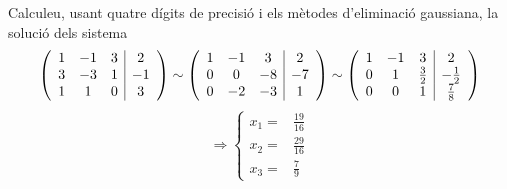 \documentclass[../main.tex]{subfiles}
\begin{document}
    \begin{exercici}
        Calculeu, usant quatre dígits de precisió i els mètodes d'eliminació gaussiana, la solució
        dels sistema
        \begin{displaymath}
            \left(
                \begin{array}{c c c | c}
                    1 & -1 & 3 & 2\\
                    3 & -3 & 1 & -1\\
                    1 & 1  & 0 & 3
                \end{array}
            \right)
            \sim
            \left(
                \begin{array}{c c c | c}
                    1 & -1 & 3 & 2\\
                    0 & 0 & -8 & -7\\
                    0 & -2  & -3 & 1
                \end{array}
            \right)
            \sim
            \left(
                \begin{array}{c c c | c}
                    1 & -1 & 3 & 2\\
                    0 & 1  & \frac{3}{2} & -\frac{1}{2}\\
                    0 & 0 & 1 & \frac{7}{8}
                \end{array}
            \right)
        \end{displaymath}
        \begin{displaymath}
            \Rightarrow \begin{cases}
                x_1 =& \frac{19}{16}\\
                x_2 =& \frac{29}{16}\\
                x_3 =& \frac{7}{9}
            \end{cases}
        \end{displaymath}
    \end{exercici}
\end{document}
